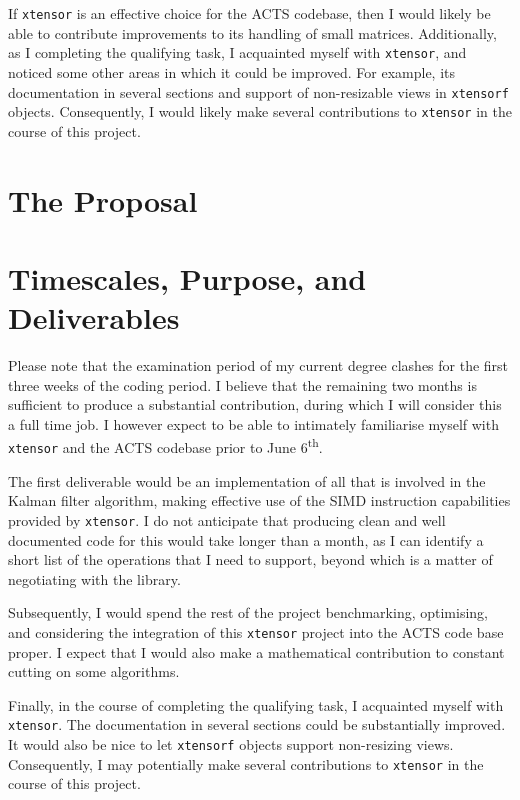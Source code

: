 \documentclass[12pt]{amsart}
\begin{document}
If \texttt{xtensor} is an effective choice for the ACTS codebase, then I would likely be able to contribute improvements to its handling of small matrices. Additionally, as I completing the qualifying task, I acquainted myself with \texttt{xtensor}, and noticed some other areas in which it could be improved. For example, its documentation in several sections and support of non-resizable views in \texttt{xtensorf} objects. Consequently, I would likely make several contributions to \texttt{xtensor} in the course of this project.

\section*{The Proposal}
\fi

\section*{Timescales, Purpose, and Deliverables}

Please note that the examination period of my current degree clashes for the first three weeks of the coding period. I believe that the remaining two months is sufficient to produce a substantial contribution, during which I will consider this a full time job. I however expect to be able to intimately familiarise myself with \texttt{xtensor} and the ACTS codebase prior to June 6\textsuperscript{th}.

The first deliverable would be an implementation of all that is involved in the Kalman filter algorithm, making effective use of the SIMD instruction capabilities provided by \texttt{xtensor}. I do not anticipate that producing clean and well documented code for this would take longer than a month, as I can identify a short list of the operations that I need to support, beyond which is a matter of negotiating with the library.

Subsequently, I would spend the rest of the project benchmarking, optimising, and considering the integration of this \texttt{xtensor} project into the ACTS code base proper. I expect that I would also make a mathematical contribution to constant cutting on some algorithms.

Finally, in the course of completing the qualifying task, I acquainted myself with \texttt{xtensor}. The documentation in several sections could be substantially improved. It would also be nice to let \texttt{xtensorf} objects support non-resizing views. Consequently, I may potentially make several contributions to \texttt{xtensor} in the course of this project.
\end{document}
